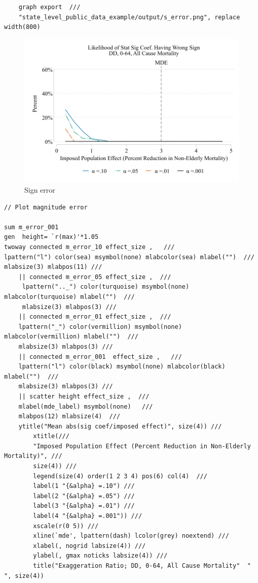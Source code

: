 \documentclass[12pt]{article}%
\begin{document}
\begin{appendices}
\begin{footnotesize}
\begin{verbatim}
    graph export  /// 
    "state_level_public_data_example/output/s_error.png", replace width(800)

\end{verbatim}
\end{footnotesize}

\FloatBarrier
\begin{figure}
  \caption{Sign error}
      \includegraphics[width=\linewidth]{../state_level_public_data_example/output/s_error.pdf}  
\end{figure}

\FloatBarrier
\begin{footnotesize}
\begin{verbatim}
// Plot magnitude error

sum m_error_001
gen  height= `r(max)'*1.05
twoway connected m_error_10 effect_size ,   /// 
lpattern("l") color(sea) msymbol(none) mlabcolor(sea) mlabel("")  /// 
mlabsize(3) mlabpos(11) ///
    || connected m_error_05 effect_size ,  /// 
     lpattern(".._") color(turquoise) msymbol(none) mlabcolor(turquoise) mlabel("")  /// 
     mlabsize(3) mlabpos(3) ///
    || connected m_error_01 effect_size ,  /// 
    lpattern("_") color(vermillion) msymbol(none) mlabcolor(vermillion) mlabel("")  /// 
    mlabsize(3) mlabpos(3) ///
    || connected m_error_001  effect_size ,   /// 
    lpattern("l") color(black) msymbol(none) mlabcolor(black) mlabel("")  /// 
    mlabsize(3) mlabpos(3) ///
    || scatter height effect_size ,  /// 
    mlabel(mde_label) msymbol(none)   /// 
    mlabpos(12) mlabsize(4)  ///
    ytitle("Mean abs(sig coef/imposed effect)", size(4)) ///
        xtitle(///
        "Imposed Population Effect (Percent Reduction in Non-Elderly Mortality)", /// 
        size(4)) ///
        legend(size(4) order(1 2 3 4) pos(6) col(4)  /// 
        label(1 "{&alpha} =.10") ///
        label(2 "{&alpha} =.05") ///
        label(3 "{&alpha} =.01") ///
        label(4 "{&alpha} =.001")) ///
        xscale(r(0 5)) ///
        xline(`mde', lpattern(dash) lcolor(grey) noextend) ///
        xlabel(, nogrid labsize(4)) ///
        ylabel(, gmax noticks labsize(4)) ///
        title("Exaggeration Ratio; DD, 0-64, All Cause Mortality"  " ", size(4))


\end{verbatim}
\end{footnotesize}
\end{appendices}
\end{document}
